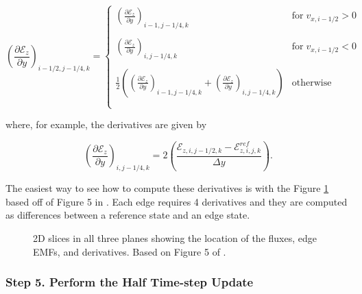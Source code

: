 \begin{equation}
    \label{eqn:emf-upwind-slope}
    \left( \frac{\partial \mathcal{E}_z }{\partial y} \right)_{i-1/2, j-1/4, k} =
        \begin{cases}
            \left( \frac{\partial \mathcal{E}_z }{\partial y} \right)_{i-1, j-1/4, k} & \text{for} \; v_{x, i-1/2} > 0
            \\
            \\
            \left( \frac{\partial \mathcal{E}_z }{\partial y} \right)_{i, j-1/4, k} & \text{for} \; v_{x, i-1/2} < 0
            \\
            \\
            \frac{1}{2} \left( \left( \frac{\partial \mathcal{E}_z }{\partial y} \right)_{i-1, j-1/4, k} + \left( \frac{\partial \mathcal{E}_z }{\partial y} \right)_{i, j-1/4, k} \right) & \text{otherwise}
            \\
            \\
        \end{cases}
\end{equation}

where, for example, the derivatives are given by

\begin{equation}
    \label{eqn:emf-slope}
    \left( \frac{\partial \mathcal{E}_z }{\partial y} \right)_{i, j-1/4, k} =
    2 \left( \frac{\mathcal{E}_{z,i,j-1/2,k} - \mathcal{E}_{z,i,j,k}^{ref}}{\Delta y} \right).
\end{equation}

The easiest way to see how to compute these derivatives is with the Figure \ref{fig:emf-graph} based off of Figure 5 in \cite{stone_athena_2008}. Each edge requires 4 derivatives and they are computed as differences between a reference state and an edge state.

\begin{figure}[ht!]
    \caption{2D slices in all three planes showing the location of the fluxes, edge EMFs, and derivatives. Based on Figure 5 of \cite{stone_athena_2008}.}
    \label{fig:emf-graph}
\end{figure}

\subsubsection{Step 5. Perform the Half Time-step Update}
\label{vlct:half-dt-update}

